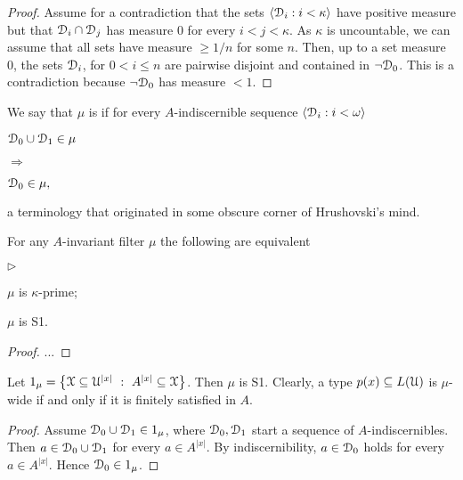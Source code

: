 \documentclass{amsproc}
\newcommand{\mylabel}[1]{{#1}\hfill}
\renewenvironment{itemize}
  {\begin{list}{$\triangleright$}{%
  \setlength{\parskip}{0mm}
  \setlength{\topsep}{.4\baselineskip}
  \setlength{\rightmargin}{0mm}
  \setlength{\listparindent}{0mm}
  \setlength{\itemindent}{0mm}
  \setlength{\labelwidth}{3ex}
  \setlength{\itemsep}{.2\baselineskip}
  \setlength{\parsep}{.2\baselineskip}
  \setlength{\partopsep}{0mm}
  \setlength{\labelsep}{1ex}
  \setlength{\leftmargin}{\labelwidth+\labelsep}
  \let\makelabel\mylabel}}{%
\end{list}}
\renewcommand*{\emph}[1]{%
   \smash{\tikz[baseline]\node[rectangle, fill=teal!25, rounded corners, inner xsep=0.5ex, inner ysep=0.2ex, anchor=base, minimum height = 2.7ex]{\strut #1};}}
\begin{document}
\begin{proof}
  Assume for a contradiction that the sets $\langle\EuScript D_i:i<\kappa\rangle$ have positive measure but that $\EuScript D_i\cap \EuScript D_j$ has measure $0$ for every $i<j<\kappa$.
  As $\kappa$ is uncountable, we can assume that all sets have measure $\ge 1/n$ for some $n$.
  Then, up to a set measure $0$, the sets $\EuScript D_i$, for $0<i\le n$ are pairwise disjoint and contained in $\neg\EuScript D_0$.
  This is a contradiction because $\neg\EuScript D_0$ has measure $<1$.
\end{proof}

We say that $\mu$ is \emph{S1\/} if for every $A$-indiscernible sequence $\langle\EuScript D_i:i<\omega\rangle$
    
\def\ceq#1#2#3{\parbox[t]{25ex}{$\displaystyle #1$}\parbox{6ex}{\hfil $#2$}{$\displaystyle #3$}}

\ceq{\hfill\EuScript D_0\cup\EuScript D_1\in\mu}{\Rightarrow}{\EuScript D_0\in\mu,}

a terminology that originated in some obscure corner of Hrushovski's mind.

\begin{fact}
  For any $A$-invariant filter $\mu$ the following are equivalent
  \begin{itemize}
    \item[1.] $\mu$ is $\kappa$-prime;
    \item[2.] $\mu$ is S1.
  \end{itemize}
\end{fact}

\begin{proof}
  ...
\end{proof}

\begin{example}\label{ex_mu_fin_sat}
  Let $1_\mu=\big\{\EuScript X\subseteq\EuScript U^{|x|}\ :\ A^{|x|}\subseteq\EuScript X\big\}$.
  Then $\mu$ is S1.
  Clearly, a type $p(x)\subseteq L(\EuScript U)$ is $\mu$-wide if and only if it is finitely satisfied in $A$.
\end{example}

\begin{proof} 
  Assume $\EuScript D_0\cup\EuScript D_1\in1_\mu$, where $\EuScript D_0,\EuScript D_1$ start a sequence of $A$-indiscernibles.
  Then $a\in\EuScript D_0\cup\EuScript D_1$ for every $a\in A^{|x|}$.
  By indiscernibility, $a\in\EuScript D_0$ holds for every $a\in A^{|x|}$.
  Hence $\EuScript D_0\in1_\mu$.
\end{proof}
\end{document}
